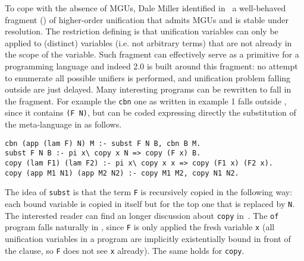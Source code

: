 \documentclass{llncs}
\begin{document}
To cope with the absence of MGUs, Dale Miller identified
in~\cite{Miller91alogic} a well-behaved fragment (\Ll{}) of higher-order
unification that admits MGUs and is stable under \lp{} resolution. 
The restriction defining \Ll{} is that unification variables can
only be applied to (distinct) variables (i.e. not arbitrary terms) that are
not already in the scope of the variable.
Such fragment can effectively serve as a primitive for a
programming language and indeed \tedius{} 2.0 is built around this fragment:
no attempt to enumerate all possible unifiers is performed, and unification
problem falling outside \Ll{} are just delayed.  Many interesting \lp{}
programs can be rewritten to fall in the fragment.
For example the \verb+cbn+ one as written in example 1 falls outside \Ll{},
since it contains \verb+(F N)+, but can be coded expressing directly
the substitution of the meta-language in \lp{} as follows.
\begin{center}
\small
\begin{minipage}{10cm}
\begin{verbatim}
cbn (app (lam F) N) M :- subst F N B, cbn B M.
subst F N B :- pi x\ copy x N => copy (F x) B.
copy (lam F1) (lam F2) :- pi x\ copy x x => copy (F1 x) (F2 x).
copy (app M1 N1) (app M2 N2) :- copy M1 M2, copy N1 N2.
\end{verbatim}
\end{minipage}
\end{center}
The idea of \verb+subst+ is that the term \verb+F+ is recursively copied in
the following way: each bound variable is copied in itself but for the top one
that is replaced by \verb+N+.
The interested reader can find an longer discussion about \verb+copy+
in~\cite[page 199]{Miller:2012:PHL:2331097}.  
The \verb+of+ program falls naturally in \Ll{}, since \verb+F+ is only applied
the fresh variable \verb+x+ (all unification variables in a \lp{} program are
implicitly existentially bound in front of the clause, so \verb+F+ does not
see \verb+x+ already).  The same holds for \verb+copy+.
\end{document}

